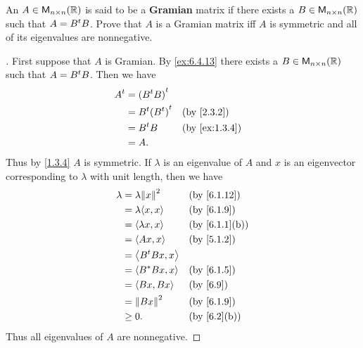 \begin{ex}\label{ex:6.4.13}
  An \(A \in \ms[n][n][\R]\) is said to be a \textbf{Gramian} matrix if there exists a \(B \in \ms[n][n][\R]\) such that \(A = {B}^{t} B\).
  Prove that \(A\) is a Gramian matrix iff \(A\) is symmetric and all of its eigenvalues are nonnegative.
\end{ex}

\begin{proof}[]
  First suppose that \(A\) is Gramian.
  By \cref{ex:6.4.13} there exists a \(B \in \ms[n][n][\R]\) such that \(A = {B}^{t} B\).
  Then we have
  \begin{align*}
    \tp{A} & = \tp{(\tp{B} B)}                         \\
           & = \tp{B} \tp{(\tp{B})} &  & \by{2.3.2}    \\
           & = \tp{B} B             &  & \by{ex:1.3.4} \\
           & = A.
  \end{align*}
  Thus by \cref{1.3.4} \(A\) is symmetric.
  If \(\lambda\) is an eigenvalue of \(A\) and \(x\) is an eigenvector corresponding to \(\lambda\) with unit length, then we have
  \begin{align*}
    \lambda & = \lambda \norm{x}^2  &  & \by{6.1.12}   \\
            & = \lambda \inn{x, x}  &  & \by{6.1.9}    \\
            & = \inn{\lambda x, x}  &  & \by{6.1.1}[b] \\
            & = \inn{Ax, x}         &  & \by{5.1.2}    \\
            & = \inn{\tp{B} B x, x}                    \\
            & = \inn{B^* B x, x}    &  & \by{6.1.5}    \\
            & = \inn{Bx, Bx}        &  & \by{6.9}      \\
            & = \norm{Bx}^2         &  & \by{6.1.9}    \\
            & \geq 0.               &  & \by{6.2}[b]
  \end{align*}
  Thus all eigenvalues of \(A\) are nonnegative.


\end{proof}
